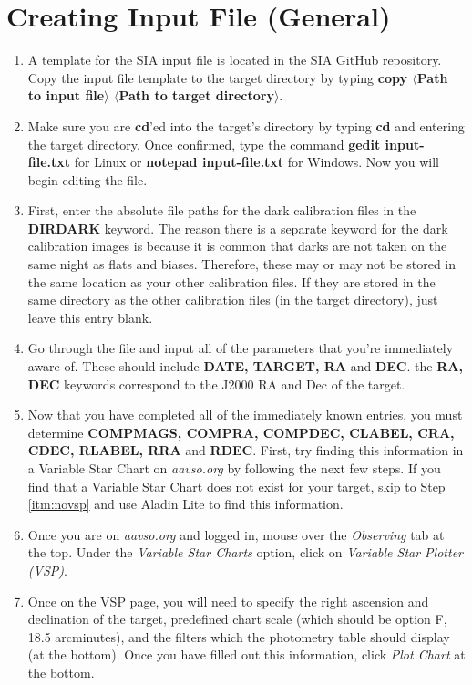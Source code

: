 \documentclass[11pt]{report}
\begin{document}
\section{Creating Input File (General)}
\label{sect:inputfile}
\begin{enumerate}
\item A template for the SIA input file is located in the SIA GitHub repository. Copy the input file template to the target directory by typing {\bf copy $\langle$Path to input file$\rangle$ $\langle$Path to target directory$\rangle$}.
\item Make sure you are {\bf cd}'ed into the target's directory by typing \textbf{cd} and entering the target directory. Once confirmed, type the command {\bf gedit input-file.txt} for Linux or {\bf notepad input-file.txt} for Windows. Now you will begin editing the file.
\item First, enter the absolute file paths for the dark calibration files in the {\bf DIRDARK} keyword. The reason there is a separate keyword for the dark calibration images is because it is common that darks are not taken on the same night as flats and biases. Therefore, these may or may not be stored in the same location as your other calibration files. If they are stored in the same directory as the other calibration files (in the target directory), just leave this entry blank.
\item Go through the file and input all of the parameters that you're immediately aware of. These should include {\bf DATE, TARGET, RA} and {\bf DEC}. the {\bf RA, DEC} keywords correspond to the J2000 RA and Dec of the target.
\item Now that you have completed all of the immediately known entries, you must determine {\bf COMPMAGS, COMPRA, COMPDEC, CLABEL, CRA, CDEC, RLABEL, RRA} and {\bf RDEC}. First, try finding this information in a Variable Star Chart on \emph{aavso.org} by following the next few steps. If you find that a Variable Star Chart does not exist for your target, skip to Step \ref{itm:novsp} and use Aladin Lite to find this information.
\item Once you are on \emph{aavso.org} and logged in, mouse over the \emph{Observing} tab at the top. Under the \emph{Variable Star Charts} option, click on \emph{Variable Star Plotter (VSP)}. 
\item Once on the VSP page, you will need to specify the right ascension and declination of the target, predefined chart scale (which should be option F, 18.5 arcminutes), and the filters which the photometry table should display (at the bottom). Once you have filled out this information, click \emph{Plot Chart} at the bottom.

\end{enumerate}
\end{document}

